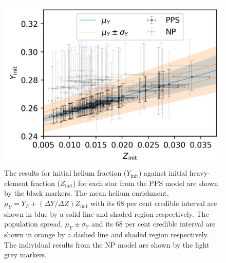 \documentclass[a4paper,fleqn,usenatbib]{mnras}
\newcommand{\mlt}{\ensuremath{{\alpha_\mathrm{MLT}}}}
\begin{document}
\begin{figure}
    \centering
    \includegraphics[width=\linewidth]{figures/zi_yi_results_plot.png}
    \caption{The results for initial helium fraction ($Y_\mathrm{init}$) against initial heavy-element fraction ($Z_\mathrm{init}$) for each star from the PPS model are shown by the black markers. The mean helium enrichment, $\mu_Y = Y_P + (\Delta Y / \Delta Z) Z_\mathrm{init}$ with its 68 per cent credible interval are shown in blue by a solid line and shaded region respectively. The population spread, $\mu_Y \pm \sigma_Y$ and its 68 per cent credible interval are shown in orange by a dashed line and shaded region respectively. The individual results from the NP model are shown by the light grey markers.}
    \label{fig:helium}
\end{figure}

\end{document}
